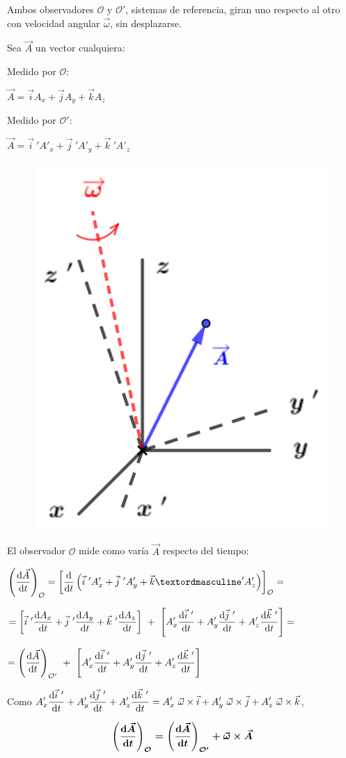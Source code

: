 \begin{multicols}{2}
Ambos observadores $\mathcal O \text{ y } \mathcal O'$, sistemas de referencia, giran uno respecto al otro con velocidad angular $\vec \omega$, sin desplazarse.

Sea $\vec A$ un vector cualquiera:

Medido por $\mathcal O$:

$\vec A=\vec i A_x+\vec j A_y+ \vec k A_z$

Medido por $\mathcal O'$:

$\vec A=\vec i\ ' A'_x+\vec j\ ' A'_y+ \vec k\ ' A'_z$
\begin{figure}[H]
	\centering
	\includegraphics[width=.4\textwidth]{imagenes/imagenes10/T10IM03.png}
\end{figure}
\end{multicols}

El observador $\mathcal O$ mide como varía $\vec A$ respecto del tiempo:

$\displaystyle \left( \dv{\vec A}{t} \right)_{\mathcal O}=
\left[ \dv{t} \left( \vec i\ ' A'_x+\vec j\ ' A'_y+ \vec kº ' A'_z \right) \right]_{\mathcal O} =$

$= \displaystyle \left[ \vec i\ ' \dv{A_x}{t} + \vec j\ ' \dv{A_y}{t} + \vec k\ ' \dv{A_z}{t} \right] \ + \ 
\left[ A'_x \dv{\vec i\ '}{t} + A'_y \dv{\vec j\ '}{t} + A'_z \dv{\vec k\ '}{t} \right] =$

$= \displaystyle  \left( \dv{\vec A}{t} \right)_{\mathcal O'} \ + \ 
\left[ A'_x \dv{\vec i\ '}{t} + A'_y \dv{\vec j\ '}{t} + A'_z \dv{\vec k\ '}{t} \right] $

Como $\displaystyle A'_x \dv{\vec i\ '}{t} + A'_y \dv{\vec j\ '}{t} + A'_z \dv{\vec k\ '}{t}= A'_x\ \vec \omega \times \vec i + A'_y\ \vec \omega \times \vec j + A'_z\ \vec \omega \times \vec k$,

\begin{equation}
	\boldsymbol{ \left( \dv{\vec A}{t} \right)_{\mathcal O}=\left( \dv{\vec A}{t} \right)_{\mathcal O'}+\vec \omega \times \vec A }
\end{equation}

